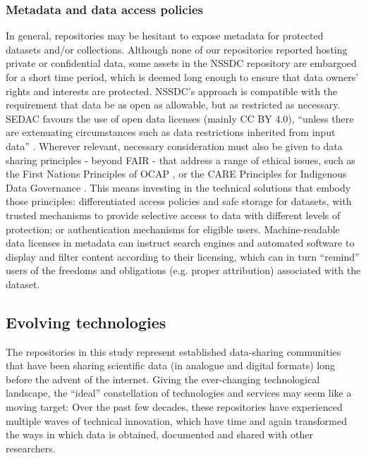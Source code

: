\documentclass{interact}
\begin{document}
\subsubsection{Metadata and data access policies}
In general, repositories may be hesitant to expose metadata for protected datasets and/or collections. Although none of our repositories reported hosting private or confidential data, some assets in the NSSDC repository are embargoed for a short time period, which is deemed long enough to ensure that data owners’ rights and interests are protected. NSSDC's approach is compatible with the requirement that data be as open as allowable, but as restricted as necessary. SEDAC favours the use of open data licenses (mainly CC BY 4.0), ``unless there are extenuating circumstances such as data restrictions inherited from input data'' \parencite{sedac_data_2021}. Wherever relevant, necessary consideration must also be given to data sharing principles - beyond FAIR - that address a range of ethical issues, such as the First Nations Principles of OCAP \parencite{fnigc_barriers_2014}, or the CARE Principles for Indigenous Data Governance \parencite{carroll_care_2020}. This means investing in the technical solutions that embody those principles: differentiated access policies and safe storage for datasets, with trusted mechanisms to provide selective access to data with different levels of protection; or authentication mechanisms for eligible users. Machine-readable data licenses in metadata \parencite{creative_commons_creative_2002} can instruct search engines and automated software to display and filter content according to their licensing, which can in turn “remind” users of the freedoms and obligations (e.g. proper attribution) associated with the dataset.

\subsection{Evolving technologies}
The repositories in this study represent established data-sharing communities that have been sharing scientific data (in analogue and digital formats) long before the advent of the internet. Giving the ever-changing technological landscape, the ``ideal'' constellation of technologies and services may seem like a moving target: Over the past few decades, these repositories have experienced multiple waves of technical innovation, which have time and again transformed the ways in which data is obtained, documented and shared with other researchers. 
\end{document}
